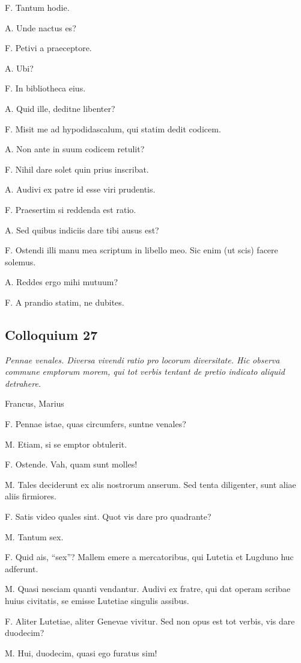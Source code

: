 \documentclass{article}
\begin{document}
F. Tantum hodie.

A. Unde nactus es?

F. Petivi a praeceptore.

A. Ubi?

F. In bibliotheca eius.

A. Quid ille, deditne libenter?

F. Misit me ad hypodidascalum, qui statim dedit codicem.

A. Non ante in suum codicem retulit?

F. Nihil dare solet quin prius inscribat.

A. Audivi ex patre id esse viri prudentis.

F. Praesertim si reddenda est ratio.

A. Sed quibus indiciis dare tibi ausus est?

F. Ostendi illi manu mea scriptum in libello meo. Sic enim (ut scis) facere solemus.

A. Reddes ergo mihi mutuum?

F. A prandio statim, ne dubites.

\subsection{Colloquium 27}
\emph{Pennae venales. Diversa vivendi ratio pro locorum diversitate. Hic observa commune emptorum morem, qui tot verbis tentant de pretio indicato aliquid detrahere.}

Francus, Marius

F. Pennae istae, quas circumfers, suntne venales?

M. Etiam, si se emptor obtulerit.

F. Ostende. Vah, quam sunt molles!

M. Tales deciderunt ex alis nostrorum anserum. Sed tenta diligenter, sunt aliae aliis firmiores.

F. Satis video quales sint. Quot vis dare pro quadrante?

M. Tantum sex.

F. Quid ais, ``sex''? Mallem emere a mercatoribus, qui Lutetia et Lugduno huc adferunt.

M. Quasi nesciam quanti vendantur. Audivi ex fratre, qui dat operam scribae huius civitatis, se emisse Lutetiae singulis assibus.

F. Aliter Lutetiae, aliter Genevae vivitur. Sed non opus est tot verbis, vis dare duodecim?

M. Hui, duodecim, quasi ego furatus sim!
\end{document}
